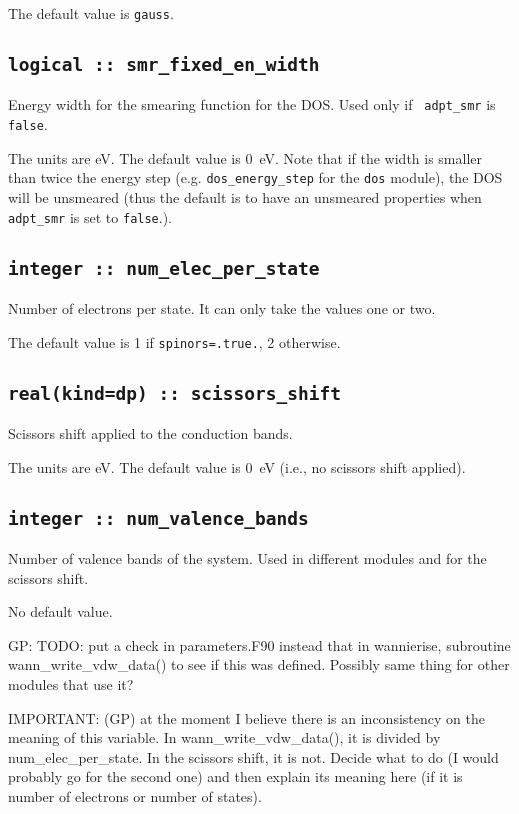 The default value is {\tt gauss}.

\subsection[smr\_fixed\_en\_width]{\tt logical :: smr\_fixed\_en\_width}
Energy width for the smearing function for the DOS. Used only if {\tt
  adpt\_smr} is \verb#false#.

The units are eV. The default value is 0~eV. Note that if the width is
smaller than twice the energy step (e.g. {\tt dos\_energy\_step} for
the {\tt dos} module), the DOS
will be unsmeared (thus the default is to have an unsmeared
properties when {\tt  adpt\_smr} is set to \verb#false#.).


  \subsection{\tt integer :: num\_elec\_per\_state} 
Number of electrons per state. It can only take the values one or
two.

The default value is 1 if {\tt spinors=.true.}, 2 otherwise.

  \subsection{\tt real(kind=dp) :: scissors\_shift} 
Scissors shift applied to the conduction bands.

The units are eV. The default value is 0~eV (i.e., no scissors shift applied).

  \subsection{\tt integer :: num\_valence\_bands} 
Number of valence bands of the system. Used in different modules and
for the scissors shift.

No default value.

{\color{red}
GP: TODO: put a check in parameters.F90  instead that in wannierise,
subroutine
wann\_write\_vdw\_data() to see if this was defined. Possibly same thing
for other modules that use it?

IMPORTANT: (GP) at the moment I believe there is an inconsistency on the
meaning of this variable. In wann\_write\_vdw\_data(), it is divided by
num\_elec\_per\_state. In the scissors shift, it is not. Decide what to
do (I would probably go for the second one) and then explain its
meaning here (if it is number of electrons or number of states).
}

